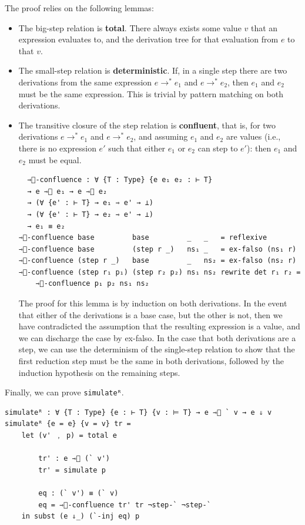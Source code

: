 The proof relies on the following lemmas:
\begin{itemize}
  \item The big-step relation is \textbf{total}. There always exists some value $v$ that an expression evaluates to, and the derivation tree for that evaluation from $e$ to that $v$.
  \item The small-step relation is \textbf{deterministic}. If, in a single step there are two derivations from the same expression $e \longrightarrow^* e_1$ and $e \longrightarrow^* e_2$, then $e_1$ and $e_2$ must be the same expression. This is trivial by pattern matching on both derivations. 
  \item The transitive closure of the step relation is \textbf{confluent}, that is, for two derivations $e \longrightarrow^* e_1$ and $e \longrightarrow^* e_2$, and assuming $e_1$ and $e_2$ are values (i.e., there is no expression $e'$ such that either $e_1$ or $e_2$ can step to $e'$): then $e_1$ and $e_2$ must be equal.
  \begin{verbatim}
  ⇾⃰-confluence : ∀ {T : Type} {e e₁ e₂ : ⊢ T}
  → e ⇾⃰ e₁ → e ⇾⃰ e₂
  → (∀ {e' : ⊢ T} → e₁ ⇾ e' → ⊥)
  → (∀ {e' : ⊢ T} → e₂ ⇾ e' → ⊥)
  → e₁ ≡ e₂
⇾⃰-confluence base         base         _   _   = reflexive
⇾⃰-confluence base         (step r _)   ns₁ _   = ex-falso (ns₁ r)
⇾⃰-confluence (step r _)   base         _   ns₂ = ex-falso (ns₂ r)
⇾⃰-confluence (step r₁ p₁) (step r₂ p₂) ns₁ ns₂ rewrite det r₁ r₂ =
    ⇾⃰-confluence p₁ p₂ ns₁ ns₂
  \end{verbatim}

  The proof for this lemma is by induction on both derivations. 
  In the event that either of the derivations is a base case, but the other is not, then we have contradicted the assumption that the resulting expression is a value, and we can discharge the case by ex-falso.
  In the case that both derivations are a step, we can use the determinism of the single-step relation to show that the first reduction step must be the same in both derivations, followed by the induction hypothesis on the remaining steps.
\end{itemize}

Finally, we can prove \texttt{simulateᴿ}. 
\begin{verbatim}
simulateᴿ : ∀ {T : Type} {e : ⊢ T} {v : ⊨ T} → e ⇾⃰ ` v → e ⇓ v
simulateᴿ {e = e} {v = v} tr = 
    let (v' ﹐ p) = total e 
        
        tr' : e ⇾⃰ (` v')
        tr' = simulate p

        eq : (` v') ≡ (` v)
        eq = ⇾⃰-confluence tr' tr ¬step-` ¬step-`
    in subst (e ⇓_) (`-inj eq) p
\end{verbatim}

